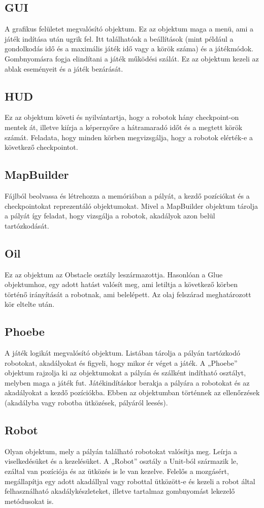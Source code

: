 \subsection{GUI}
A grafikus felületet megvalósító objektum. Ez az objektum maga a menü, ami a játék indítása után ugrik fel. Itt találhatóak a beállítások (mint például a gondolkodás idő és a maximális játék idő vagy a körök száma) és a játékmódok. Gombnyomásra fogja elindítani a játék működési szálát. Ez az objektum kezeli az ablak eseményeit és a játék bezárását.
\subsection{HUD}
Ez az objektum követi és nyilvántartja, hogy a robotok hány checkpoint-on mentek át, illetve kiírja a képernyőre a hátramaradó időt és a megtett körök számát. Feladata, hogy minden körben megvizsgálja, hogy a robotok elérték-e a következő checkpointot.
\subsection{MapBuilder}
Fájlból beolvassa és létrehozza a memóriában a pályát, a kezdő pozíciókat és a checkpointokat reprezentáló objektumokat.  Mivel a  MapBuilder objektum tárolja a pályát így feladat, hogy vizsgálja a robotok, akadályok azon belül tartózkodását.  
\subsection{Oil}
Ez az objektum az Obstacle osztály leszármazottja. Hasonlóan a Glue objektumhoz, egy adott hatást valósít meg, ami letiltja a következő körben történő irányítását a robotnak, ami belelépett.  Az olaj felszárad meghatározott kör eltelte után.
\subsection{Phoebe}
A játék logikát megvalósító objektum. Listában tárolja a pályán tartózkodó robotokat, akadályokat és figyeli, hogy mikor ér véget a játék. A „Phoebe” objektum rajzolja ki az objektumokat a pályán és szálként indítható osztályt, melyben maga a játék fut. Játékindításkor berakja a pályára a robotokat és az akadályokat a kezdő pozíciókba. Ebben az objektumban történnek az ellenőrzések (akadályba vagy robotba ütközések, pályáról leesés).
\subsection{Robot}
Olyan objektum, mely a pályán található robotokat valósítja meg. Leírja a viselkedésüket és a kezelésüket. A „Robot” osztály a Unit-ból származik le, ezáltal van pozíciója és az ütközés is le van kezelve. Felelős a mozgásért, megállapítja egy adott akadállyal vagy robottal ütközött-e és kezeli a robot által felhasználható akadálykészleteket, illetve tartalmaz gombnyomást lekezelő metódusokat is.
